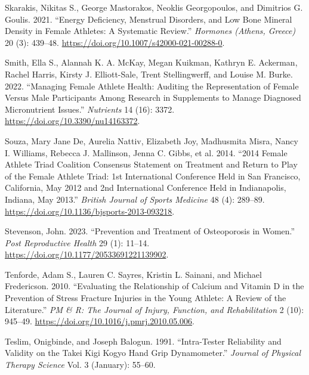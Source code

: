 \documentclass[
]{article}
\newlength{\cslhangindent}
\newenvironment{CSLReferences}[2] %
 {\begin{list}{}{%
  \setlength{\itemindent}{0pt}
  \setlength{\leftmargin}{0pt}
  \setlength{\parsep}{0pt}
  \ifodd #1
   \setlength{\leftmargin}{\cslhangindent}
   \setlength{\itemindent}{-1\cslhangindent}
  \fi
  \setlength{\itemsep}{#2\baselineskip}}}
 {\end{list}}
\begin{document}
\begin{CSLReferences}{1}{0}
Skarakis, Nikitas S., George Mastorakos, Neoklis Georgopoulos, and Dimitrios G. Goulis. 2021. {``Energy Deficiency, Menstrual Disorders, and Low Bone Mineral Density in Female Athletes: A Systematic Review.''} \emph{Hormones (Athens, Greece)} 20 (3): 439--48. \url{https://doi.org/10.1007/s42000-021-00288-0}.

Smith, Ella S., Alannah K. A. McKay, Megan Kuikman, Kathryn E. Ackerman, Rachel Harris, Kirsty J. Elliott-Sale, Trent Stellingwerff, and Louise M. Burke. 2022. {``Managing {Female} {Athlete} {Health}: {Auditing} the {Representation} of {Female} Versus {Male} {Participants} Among {Research} in {Supplements} to {Manage} {Diagnosed} {Micronutrient} {Issues}.''} \emph{Nutrients} 14 (16): 3372. \url{https://doi.org/10.3390/nu14163372}.

Souza, Mary Jane De, Aurelia Nattiv, Elizabeth Joy, Madhusmita Misra, Nancy I. Williams, Rebecca J. Mallinson, Jenna C. Gibbs, et al. 2014. {``2014 {Female} {Athlete} {Triad} {Coalition} {Consensus} {Statement} on {Treatment} and {Return} to {Play} of the {Female} {Athlete} {Triad}: 1st {International} {Conference} Held in {San} {Francisco}, {California}, {May} 2012 and 2nd {International} {Conference} Held in {Indianapolis}, {Indiana}, {May} 2013.''} \emph{British Journal of Sports Medicine} 48 (4): 289--89. \url{https://doi.org/10.1136/bjsports-2013-093218}.

Stevenson, John. 2023. {``Prevention and Treatment of Osteoporosis in Women.''} \emph{Post Reproductive Health} 29 (1): 11--14. \url{https://doi.org/10.1177/20533691221139902}.

Tenforde, Adam S., Lauren C. Sayres, Kristin L. Sainani, and Michael Fredericson. 2010. {``Evaluating the Relationship of Calcium and Vitamin {D} in the Prevention of Stress Fracture Injuries in the Young Athlete: A Review of the Literature.''} \emph{PM \& R: The Journal of Injury, Function, and Rehabilitation} 2 (10): 945--49. \url{https://doi.org/10.1016/j.pmrj.2010.05.006}.

Teslim, Onigbinde, and Joseph Balogun. 1991. {``Intra-Tester {Reliability} and {Validity} on the {Takei} {Kigi} {Kogyo} {Hand} {Grip} {Dynamometer}.''} \emph{Journal of Physical Therapy Science} Vol. 3 (January): 55--60.


\end{CSLReferences}
\end{document}

